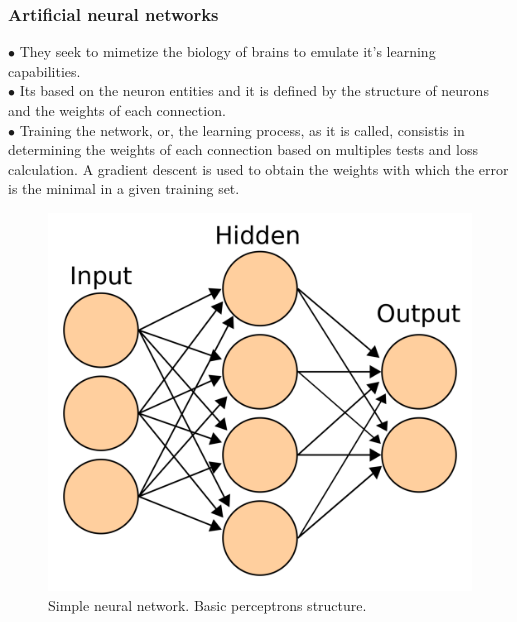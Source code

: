 \documentclass[xcolor=dvipsnames,10pt,aspectratio=169]{beamer}
\begin{document}
\begin{frame}\frametitle{Artificial neural networks}
	\begin{minipage}[h!]{0.39\textwidth}
		$\bullet$ They seek to mimetize the biology of brains to emulate it's learning capabilities.\\
		$\bullet$ Its based on the neuron entities and it is defined by the structure of neurons and the weights of each connection.\\
		$\bullet$ Training the network, or, the learning process, as it is called, consistis in determining the weights of each connection based on multiples tests and loss calculation. A gradient descent is used to obtain the weights with which the error is the minimal in a given training set.
	\end{minipage}
	\begin{minipage}[h!]{0.6\textwidth}
		\begin{figure}[h!]
			\centering
			\includegraphics[trim = {0cm 0cm 0cm 0cm}, clip , angle=0, scale=0.18]{./my_images/neural_figure.png}
			\caption{Simple neural network. Basic perceptrons structure.}
		\end{figure}
	\end{minipage}
\end{frame}
\end{document}

